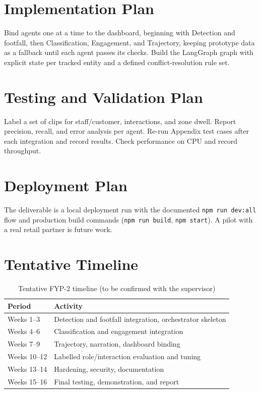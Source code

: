\section{Implementation Plan}
Bind agents one at a time to the dashboard, beginning with Detection and footfall, then Classification, Engagement, and Trajectory, keeping prototype data as a fallback until each agent passes its checks. Build the LangGraph graph with explicit state per tracked entity and a defined conflict-resolution rule set.

\section{Testing and Validation Plan}
Label a set of clips for staff/customer, interactions, and zone dwell. Report precision, recall, and error analysis per agent. Re-run Appendix test cases after each integration and record results. Check performance on CPU and record throughput.

\section{Deployment Plan}
The deliverable is a local deployment run with the documented \texttt{npm run dev:all} flow and production build commands (\texttt{npm run build}, \texttt{npm start}). A pilot with a real retail partner is future work.

\section{Tentative Timeline}
\begin{table}[H]
\centering
\caption{Tentative FYP-2 timeline (to be confirmed with the supervisor)}
\begin{tabular}{P{0.2\textwidth}P{0.67\textwidth}}
\toprule
Period & Activity\\
\midrule
Weeks 1--3 & Detection and footfall integration, orchestrator skeleton\\
Weeks 4--6 & Classification and engagement integration\\
Weeks 7--9 & Trajectory, narration, dashboard binding\\
Weeks 10--12 & Labelled role/interaction evaluation and tuning\\
Weeks 13--14 & Hardening, security, documentation\\
Weeks 15--16 & Final testing, demonstration, and report\\
\bottomrule
\end{tabular}
\end{table}

